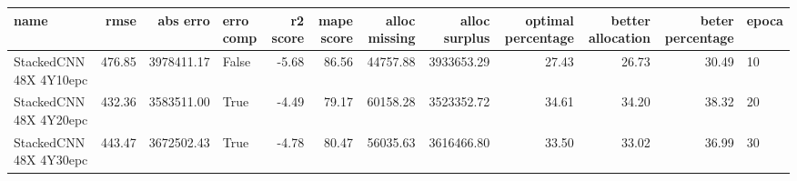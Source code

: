 \begin{tabular}{lrrlrrrrrrrl}
\toprule
name & rmse & abs erro & erro comp & r2 score & mape score & alloc missing & alloc surplus & optimal percentage & better allocation & beter percentage & epoca \\
\midrule
StackedCNN 48X 4Y10epc & 476.85 & 3978411.17 & False & -5.68 & 86.56 & 44757.88 & 3933653.29 & 27.43 & 26.73 & 30.49 & 10 \\
StackedCNN 48X 4Y20epc & 432.36 & 3583511.00 & True & -4.49 & 79.17 & 60158.28 & 3523352.72 & 34.61 & 34.20 & 38.32 & 20 \\
StackedCNN 48X 4Y30epc & 443.47 & 3672502.43 & True & -4.78 & 80.47 & 56035.63 & 3616466.80 & 33.50 & 33.02 & 36.99 & 30 \\
\bottomrule
\end{tabular}
